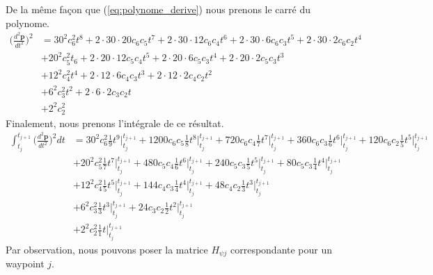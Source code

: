 \documentclass{article}
\begin{document}
De la même façon que (\ref{eq:polynome_derive}) nous prenons le carré du polynome.
\begin{align*}
	\Bigg(\frac{d^2 \boldsymbol{p}}{dt^2}\Bigg)^2 &= 
		30^2 c_6^2 t^8 + 2 \cdot 30 \cdot 20 c_6 c_5 t^7 + 2 \cdot 30 \cdot 12 c_6 c_4 t^6 + 2 \cdot 30 \cdot 6 c_6 c_3 t^5 + 2 \cdot 30 \cdot 2 c_6 c_2 t^4 \\
	&+ 20^2 c_5^2 t_6 + 2 \cdot 20 \cdot 12 c_5 c_4 t^5 + 2 \cdot 20 \cdot 6 c_5 c_3 t^4 + 2 \cdot 20 \cdot 2 c_5 c_3 t^3 \\
	&+ 12^2 c_4^2 t^4 + 2 \cdot 12 \cdot 6 c_4 c_3 t^3 + 2 \cdot 12 \cdot 2 c_4 c_2 t^2 \\
	&+ 6^2 c_3^2 t^2 + 2 \cdot 6 \cdot 2 c_3 c_2 t\\
	&+ 2^2 c_2^2
\end{align*}
Finalement, nous prenons l'intégrale de ce résultat.
\begin{align*}
	\int_{t_j}^{t_{j+1}}\Bigg(\frac{d^2 \boldsymbol{p}}{dt^2}\Bigg)^2 dt&= 
		30^2 c_6^2 \frac{1}{9} t^9 \Big|_{t_j}^{t_{j+1}}
		+ 1200 c_6 c_5 \frac{1}{8}t^8 \Big|_{t_j}^{t_{j+1}}
		+ 720 c_6 c_4 \frac{1}{7}t^7 \Big|_{t_j}^{t_{j+1}}
		+ 360 c_6 c_3 \frac{1}{6}t^6 \Big|_{t_j}^{t_{j+1}}
		+ 120 c_6 c_2 \frac{1}{5}t^5 \Big|_{t_j}^{t_{j+1}}\\
	&+ 20^2 c_5^2 \frac{1}{7}t^7 \Big|_{t_j}^{t_{j+1}}
		+ 480 c_5 c_4 \frac{1}{6}t^6 \Big|_{t_j}^{t_{j+1}}
		+ 240 c_5 c_3 \frac{1}{5}t^5 \Big|_{t_j}^{t_{j+1}}
		+ 80 c_5 c_3 \frac{1}{4}t^4 \Big|_{t_j}^{t_{j+1}}\\
	&+ 12^2 c_4^2 \frac{1}{5}t^5 \Big|_{t_j}^{t_{j+1}}
		+ 144 c_4 c_3 \frac{1}{4}t^4 \Big|_{t_j}^{t_{j+1}}
		+ 48 c_4 c_2 \frac{1}{3}t^3 \Big|_{t_j}^{t_{j+1}}\\
	&+ 6^2 c_3^2 \frac{1}{3}t^3 \Big|_{t_j}^{t_{j+1}}
		+ 24 c_3 c_2 \frac{1}{2}t^2 \Big|_{t_j}^{t_{j+1}}\\
	&+ 2^2 c_2^2 \frac{1}{1}t\Big|_{t_j}^{t_{j+1}}
\end{align*}
Par observation, nous pouvons poser la matrice $H_{\psi j}$ correspondante pour un waypoint $j$.
\end{document}

